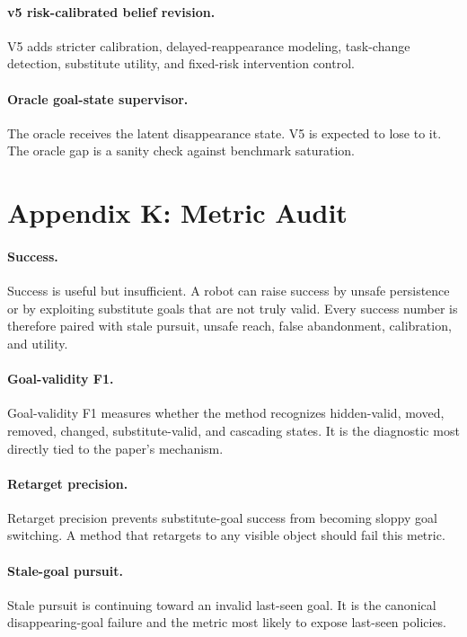 \documentclass{article}
\begin{document}
\paragraph{v5 risk-calibrated belief revision.}
V5 adds stricter calibration, delayed-reappearance modeling, task-change detection, substitute utility, and fixed-risk intervention control.

\paragraph{Oracle goal-state supervisor.}
The oracle receives the latent disappearance state. V5 is expected to lose to it. The oracle gap is a sanity check against benchmark saturation.

\section{Appendix K: Metric Audit}
\paragraph{Success.}
Success is useful but insufficient. A robot can raise success by unsafe persistence or by exploiting substitute goals that are not truly valid. Every success number is therefore paired with stale pursuit, unsafe reach, false abandonment, calibration, and utility.

\paragraph{Goal-validity F1.}
Goal-validity F1 measures whether the method recognizes hidden-valid, moved, removed, changed, substitute-valid, and cascading states. It is the diagnostic most directly tied to the paper's mechanism.

\paragraph{Retarget precision.}
Retarget precision prevents substitute-goal success from becoming sloppy goal switching. A method that retargets to any visible object should fail this metric.

\paragraph{Stale-goal pursuit.}
Stale pursuit is continuing toward an invalid last-seen goal. It is the canonical disappearing-goal failure and the metric most likely to expose last-seen policies.
\end{document}
